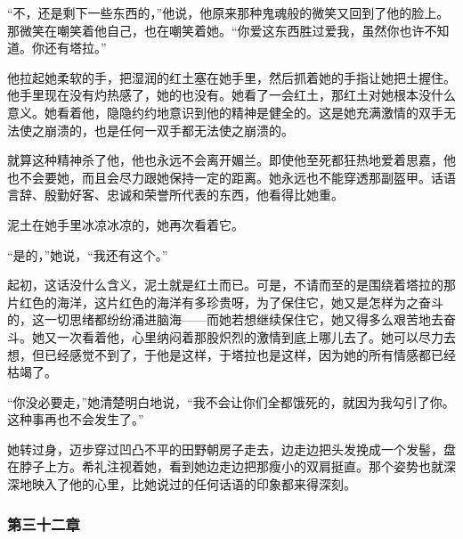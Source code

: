 \par “不，还是剩下一些东西的，”他说，他原来那种鬼魂般的微笑又回到了他的脸上。那微笑在嘲笑着他自己，也在嘲笑着她。“你爱这东西胜过爱我，虽然你也许不知道。你还有塔拉。”
\par 他拉起她柔软的手，把湿润的红土塞在她手里，然后抓着她的手指让她把土握住。他手里现在没有灼热感了，她的也没有。她看了一会红土，那红土对她根本没什么意义。她看着他，隐隐约约地意识到他的精神是健全的。这是她充满激情的双手无法使之崩溃的，也是任何一双手都无法使之崩溃的。
\par 就算这种精神杀了他，他也永远不会离开媚兰。即使他至死都狂热地爱着思嘉，他也不会要她，而且会尽力跟她保持一定的距离。她永远也不能穿透那副盔甲。话语言辞、殷勤好客、忠诚和荣誉所代表的东西，他看得比她重。
\par 泥土在她手里冰凉冰凉的，她再次看着它。
\par “是的，”她说，“我还有这个。”
\par 起初，这话没什么含义，泥土就是红土而已。可是，不请而至的是围绕着塔拉的那片红色的海洋，这片红色的海洋有多珍贵呀，为了保住它，她又是怎样为之奋斗的，这一切思绪都纷纷涌进脑海——而她若想继续保住它，她又得多么艰苦地去奋斗。她又一次看着他，心里纳闷着那股炽烈的激情到底上哪儿去了。她可以尽力去想，但已经感觉不到了，于他是这样，于塔拉也是这样，因为她的所有情感都已经枯竭了。
\par “你没必要走，”她清楚明白地说，“我不会让你们全都饿死的，就因为我勾引了你。这种事再也不会发生了。”
\par 她转过身，迈步穿过凹凸不平的田野朝房子走去，边走边把头发挽成一个发髻，盘在脖子上方。希礼注视着她，看到她边走边把那瘦小的双肩挺直。那个姿势也就深深地映入了他的心里，比她说过的任何话语的印象都来得深刻。

\subsubsection{第三十二章}

